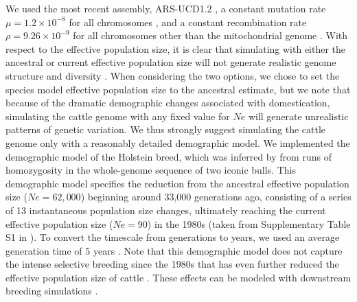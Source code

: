 \documentclass[hidelinks]{article}
\begin{document}
We used the most recent assembly, ARS-UCD1.2
\citep{Rosen2020}, a constant mutation rate \(\mu=1.2\times 10^{-8}\) for all chromosomes \citep{Harland2017}, and a constant recombination rate \(\rho=9.26 \times 10^{-9}\) for all chromosomes other than the mitochondrial genome \citep{Ma2015}.
%
With respect to the effective population size, it is clear that simulating with either the ancestral or current effective population size will not generate realistic genome structure and diversity \citep{MacLeod2013,Rosen2020}.
%
When considering the two options, we chose to set the species model effective population size to the ancestral estimate, but we note that because of the dramatic demographic changes associated with domestication, simulating the cattle genome with any fixed value for $Ne$ will generate unrealistic patterns of genetic variation.
%
We thus strongly suggest simulating the cattle genome only with a reasonably detailed demographic model.
%
We implemented the demographic model of the Holstein breed, which was
inferred by \cite{MacLeod2013} from runs of homozygosity in the whole-genome sequence of two iconic bulls.
%
This demographic model specifies the reduction from the ancestral effective population size ($Ne=62,000$) beginning around 33,000 generations ago, consisting of a series of 13 instantaneous population size changes, ultimately reaching the current effective population size ($Ne=90$) in the 1980s (taken from Supplementary Table S1 in \cite{MacLeod2013}).
%
To convert the timescale from generations to years, we used an average generation time of $5$ years \citep{MacLeod2013}.
%
Note that this demographic model does not capture the intense selective breeding since the 1980s that has even further reduced the effective population size of cattle \citep{MacLeod2013, VanRaden2020, Makanjouloa2020}. These effects can be modeled with
downstream breeding simulations \citep[e.g.,][]{Gaynor2020}.
%
\end{document}
